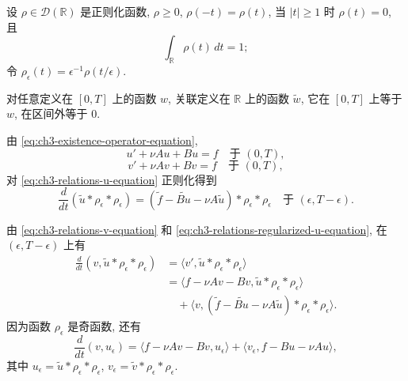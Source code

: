 \begin{Proof}
设 $\rho\in\mathcal D(\mathbb R)$ 是正则化函数, $\rho\geq0$, $\rho(-t)=\rho(t)$, 当 $|t|\geq1$ 时 $\rho(t)=0$, 且
\[
\int_\mathbb R\rho(t)\,dt=1;
\]
令 $\rho_\epsilon(t)=\epsilon^{-1}\rho(t/\epsilon)$.

对任意定义在 $[0,T]$ 上的函数 $w$, 关联定义在 $\mathbb R$ 上的函数 $\widetilde w$, 它在 $[0,T]$ 上等于 $w$, 在区间外等于 $0$.

由 \eqref{eq:ch3-existence-operator-equation},
\begin{equation}
u'+\nu Au+Bu=f\quad\text{于 }(0,T),
\label{eq:ch3-relations-u-equation}
\end{equation}
\begin{equation}
v'+\nu Av+Bv=f\quad\text{于 }(0,T),
\label{eq:ch3-relations-v-equation}
\end{equation}
对 \eqref{eq:ch3-relations-u-equation} 正则化得到
\begin{equation}
\frac d{dt}(\widetilde u*\rho_\epsilon*\rho_\epsilon)
=(\widetilde f-\widetilde{Bu}-\nu A\widetilde u)
*\rho_\epsilon*\rho_\epsilon
\quad\text{于 }(\epsilon,T-\epsilon).
\label{eq:ch3-relations-regularized-u-equation}
\end{equation}

\hypertarget{chapter-03-page-226}{}
由 \eqref{eq:ch3-relations-v-equation} 和 \eqref{eq:ch3-relations-regularized-u-equation}, 在 $(\epsilon,T-\epsilon)$ 上有
\[
\begin{aligned}
\frac d{dt}(v,\widetilde u*\rho_\epsilon*\rho_\epsilon)
&=\langle v',\widetilde u*\rho_\epsilon*\rho_\epsilon\rangle\\
&=\langle f-\nu Av-Bv,\widetilde u*\rho_\epsilon*\rho_\epsilon\rangle\\
&\quad+\langle v,(\widetilde f-\widetilde{Bu}-\nu A\widetilde u)
*\rho_\epsilon*\rho_\epsilon\rangle.
\end{aligned}
\]
因为函数 $\rho_\epsilon$ 是奇函数, 还有
\begin{equation}
\frac d{dt}(v,u_\epsilon)
=\langle f-\nu Av-Bv,u_\epsilon\rangle
+\langle v_\epsilon,f-Bu-\nu Au\rangle,
\label{eq:ch3-relations-regularized-cross-derivative}
\end{equation}
其中 $u_\epsilon=\widetilde u*\rho_\epsilon*\rho_\epsilon$, $v_\epsilon=\widetilde v*\rho_\epsilon*\rho_\epsilon$.


\end{Proof}
